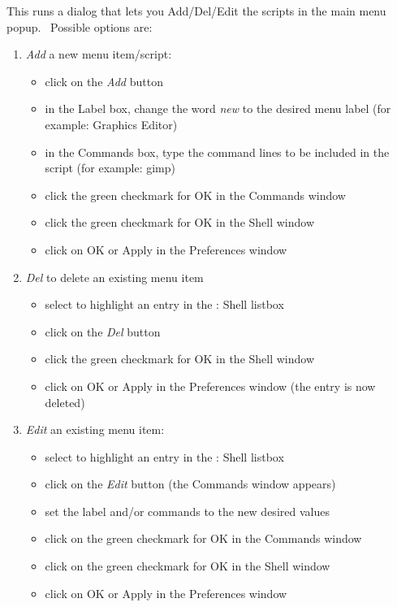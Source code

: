 This runs a dialog that lets you Add/Del/Edit the scripts in the main menu popup. \ Possible options are:\newline

\begin{enumerate}
	\item \textit{Add} a new menu item/script:
	\begin{itemize}[noitemsep]
		\item click on the \textit{Add} button
		\item in the Label box, change the word \textit{new} to the desired menu label (for example: Graphics Editor)
		\item in the Commands box, type the command lines to be included in the script (for example: gimp)
		\item click the green checkmark for OK in the Commands window
		\item click the green checkmark for OK in the Shell window
		\item click on OK or Apply in the Preferences window
	\end{itemize}
	\item \textit{Del} to delete an existing menu item
	\begin{itemize}[noitemsep]
		\item select to highlight an entry in the \CGG{}: Shell listbox
		\item click on the \textit{Del }button
		\item click the green checkmark for OK in the Shell window
		\item click on OK or Apply in the Preferences window (the entry is now deleted)
	\end{itemize}
	\item \textit{Edit} an existing menu item:
	\begin{itemize}[noitemsep]
		\item select to highlight an entry in the \CGG{}: Shell listbox
		\item click on the \textit{Edit} button (the Commands window appears)
		\item set the label and/or commands to the new desired values
		\item click on the green checkmark for OK in the Commands window
		\item click on the green checkmark for OK in the Shell window
		\item click on OK or Apply in the Preferences window
	\end{itemize} 
\end{enumerate}
	
